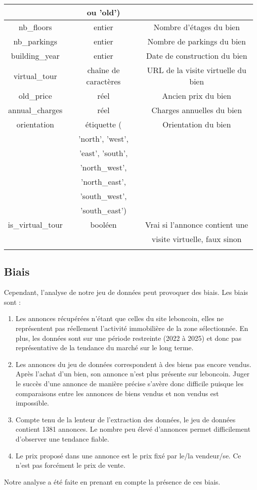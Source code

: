 \documentclass[a4paper, 12pt, twoside]{report}
\begin{document}
\begin{longtable}[c]{|c|c|c|}
				& ou 'old') & \\ 
				\hline
				nb\_floors & entier & Nombre d'étages du bien \\ 
				\hline
				nb\_parkings & entier & Nombre de parkings du bien \\ 
				\hline
				building\_year & entier & Date de construction du bien \\ 
				\hline
				virtual\_tour & chaîne de caractères & URL de la visite virtuelle du bien \\ 
				\hline
				old\_price & réel & Ancien prix du bien \\ 
				\hline
				annual\_charges & réel & Charges annuelles du bien \\ 
				\hline
				orientation & étiquette ( & Orientation du bien \\
				& 'north', 'west', & \\
				& 'east', 'south', & \\ 
				& 'north\_west', & \\
				& 'north\_east', & \\
				& 'south\_west', & \\
				& 'south\_east') & \\ 
				\hline
				is\_virtual\_tour & booléen & Vrai si l'annonce contient une \\ 
				& & visite virtuelle, faux sinon \\ 
				\hline
			\endlastfoot
		\end{longtable}

		\subsection{Biais}

		Cependant, l'analyse de notre jeu de données peut provoquer des biais. Les biais sont :
		\begin{enumerate}
			\item Les annonces récupérées n’étant que celles du site leboncoin, elles ne représentent pas réellement l’activité immobilière de la zone sélectionnée. En plus, les données sont sur une période restreinte (2022 à 2025) et donc pas représentative de la tendance du marché sur le long terme.
			\item Les annonces du jeu de données correspondent à des biens pas encore vendus. Après l'achat d'un bien, son annonce n'est plus présente sur leboncoin. Juger le succès d’une annonce de manière précise s’avère donc difficile puisque les comparaisons entre les annonces de biens vendus et non vendus est impossible.
			\item Compte tenu de la lenteur de l’extraction des données, le jeu de données contient 1381 annonces. Le nombre peu élevé d'annonces permet difficilement d’observer une tendance fiable.
			\item Le prix proposé dans une annonce est le prix fixé par le/la vendeur/se. Ce n’est pas forcément le prix de vente.
		\end{enumerate}
		Notre analyse a été faite en prenant en compte la présence de ces biais. \\
\end{document}
